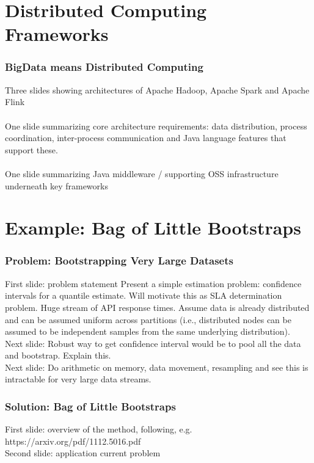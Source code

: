 \documentclass[14pt,mathserif]{beamer}
\begin{document}
\section[History]{Distributed Computing Frameworks}

\begin{frame}
  \frametitle{BigData means Distributed Computing}
Three slides showing architectures of Apache Hadoop, Apache Spark and Apache Flink
\\
\\
One slide summarizing core architecture requirements: data distribution, process coordination, inter-process communication and Java language features that support these.
\\
\\
One slide summarizing Java middleware / supporting OSS infrastructure underneath key frameworks

\end{frame}

\section[History]{Example: Bag of Little Bootstraps}

\begin{frame}
  \frametitle{Problem: Bootstrapping Very Large Datasets}
  \begin{small}
  First slide: problem statement
Present a simple estimation problem: confidence intervals for a quantile estimate.  Will motivate this as SLA determination problem. Huge stream of API response times.  Assume data is already distributed and can be assumed uniform across partitions (i.e., distributed nodes can be assumed to be independent samples from the same underlying distribution).
\\
Next slide: Robust way to get confidence interval would be to pool all the data and bootstrap.  Explain this.
\\
Next slide: Do arithmetic on memory, data movement, resampling and see this is intractable for very large data streams.
\end{small}
\end{frame}

\begin{frame}
  \frametitle{Solution: Bag of Little Bootstraps}
  First slide: overview of the method, following, e.g. 
  https://arxiv.org/pdf/1112.5016.pdf
  \\
  Second slide: application current problem
\end{frame} 
\end{document}
